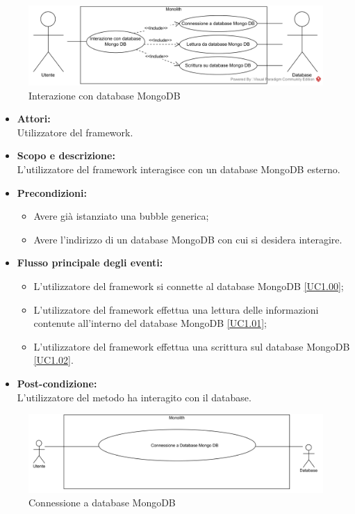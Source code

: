 
\begin{figure}[H]
	\centering
	\includegraphics[width=15cm]{../../documenti/AnalisiDeiRequisiti/Diagrammi_img/Database.png}
	\caption{\UCCaption{} Interazione con database MongoDB}
\end{figure}

\begin{itemize}
	\item \textbf{Attori:}
	\\Utilizzatore del framework.
	\item \textbf{Scopo e descrizione:} 
	\\L'utilizzatore del framework interagisce con un database MongoDB esterno.
	\item \textbf{Precondizioni:}
	\begin{itemize}
		\item Avere già istanziato una bubble generica;
		\item Avere l'indirizzo di un database MongoDB con cui si desidera interagire.
	\end{itemize}
	\item \textbf{Flusso principale degli eventi:}
	\begin{itemize}
		\item L'utilizzatore del framework si connette al database MongoDB \ref{UC1.00};
		\item L'utilizzatore del framework effettua una lettura delle informazioni contenute all'interno del database MongoDB \ref{UC1.01};
		\item L'utilizzatore del framework effettua una scrittura sul database MongoDB \ref{UC1.02}.
	\end{itemize}
	\item \textbf{Post-condizione:}
	\\L'utilizzatore del metodo ha interagito con il database.
\end{itemize}

\begin{samepage}
\nopagebreak
\begin{figure}[H]
	\centering
	\includegraphics[width=15cm]{../../documenti/AnalisiDeiRequisiti/Diagrammi_img/uc1_00.png}
	\caption{\UCFCaption{} Connessione a database MongoDB}
\end{figure}
\end{samepage}

